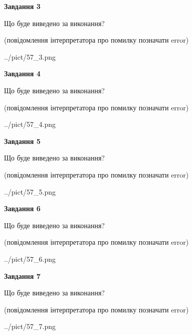 \documentclass[12pt, ukrainian]{article}
\begin{document}
{\begin {large}
{\begin {center}\textbf{Завдання 3}\end {center}}\par
Що буде виведено за виконання?\par
 (повідомлення інтерпретатора про помилку позначати error)\par
\begin{center}
	{../pict/57_3.png}
\end{center}
\newpage

{\begin {center}\textbf{Завдання 4}\end {center}}\par
Що буде виведено за виконання?\par
 (повідомлення інтерпретатора про помилку позначати error)\par
\begin{center}
	{../pict/57_4.png}
\end{center}
\newpage

{\begin {center}\textbf{Завдання 5}\end {center}}\par
Що буде виведено за виконання?\par
 (повідомлення інтерпретатора про помилку позначати error)\par
\begin{center}
	{../pict/57_5.png}
\end{center}
\newpage

{\begin {center}\textbf{Завдання 6}\end {center}}\par
Що буде виведено за виконання?\par
 (повідомлення інтерпретатора про помилку позначати error)\par
\begin{center}
	{../pict/57_6.png}
\end{center}
\newpage

{\begin {center}\textbf{Завдання 7}\end {center}}\par
Що буде виведено за виконання?\par
 (повідомлення інтерпретатора про помилку позначати error)\par
\begin{center}
	{../pict/57_7.png}
\end{center}
\newpage


\end{large}}
\end{document}
